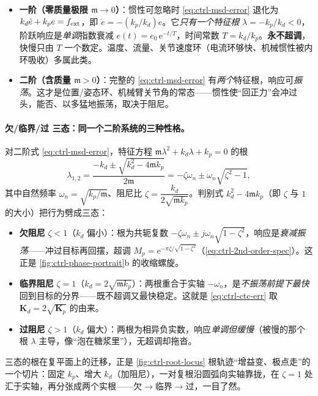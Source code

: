 \begin{itemize}
  \item \textbf{一阶（零质量极限 $\mathfrak m\to0$）}：惯性可忽略时 \cref{eq:ctrl-msd-error} 退化为 $k_d\dot e+k_pe=f_{\rm ext}$，即 $\dot e=-(k_p/k_d)e$。它\emph{只有一个特征根} $\lambda=-k_p/k_d<0$，阶跃响应是\emph{单调}指数衰减 $e(t)=e_0\,\mathrm e^{-t/T}$，时间常数 $T=k_d/k_p$。\textbf{永不超调}，快慢只由 $T$ 一个数定。温度、流量、关节速度环（电流环够快、机械惯性被内环吸收）多属此类。
  \item \textbf{二阶（含质量 $\mathfrak m>0$）}：完整的 \cref{eq:ctrl-msd-error} 有\emph{两个}特征根，响应可\emph{振荡}。这才是位置/姿态环、机械臂关节角的常态——惯性使“回正力”会冲过头，能否、以多猛地振荡，取决于阻尼。
\end{itemize}

\paragraph{欠/临界/过 三态：同一个二阶系统的三种性格。}
对二阶式 \cref{eq:ctrl-msd-error}，特征方程 $\mathfrak m\lambda^2+k_d\lambda+k_p=0$ 的根
\begin{equation}
  \lambda_{1,2}=\frac{-k_d\pm\sqrt{k_d^2-4\mathfrak m k_p}}{2\mathfrak m}
  =-\zeta\omega_n\pm\omega_n\sqrt{\zeta^2-1},
  \label{eq:ctrl-msd-roots}
\end{equation}
其中自然频率 $\omega_n=\sqrt{k_p/\mathfrak m}$、阻尼比 $\zeta=\dfrac{k_d}{2\sqrt{\mathfrak m k_p}}$。判别式 $k_d^2-4\mathfrak m k_p$（即 $\zeta$ 与 $1$ 的大小）把行为劈成三态\cite{lynch2017modern}：
\begin{itemize}
  \item \textbf{欠阻尼} $\zeta<1$（$k_d$ 偏小）：根为共轭复数 $-\zeta\omega_n\pm j\omega_n\sqrt{1-\zeta^2}$，响应是\emph{衰减振荡}——冲过目标再回摆，超调 $M_p=\mathrm e^{-\pi\zeta/\sqrt{1-\zeta^2}}$（\cref{eq:ctrl-2nd-order-spec}）。这正是 \cref{fig:ctrl-phase-portrait}b 的收缩螺旋。
  \item \textbf{临界阻尼} $\zeta=1$（$k_d=2\sqrt{\mathfrak m k_p}$）：两根重合于实轴 $-\omega_n$，是\emph{不振荡前提下最快}回到目标的分界——既不超调又最快稳定。这就是 \cref{eq:ctrl-ctc-err} 取 $\mathbf K_d=2\sqrt{\mathbf K_p}$ 的由来。
  \item \textbf{过阻尼} $\zeta>1$（$k_d$ 偏大）：两根为相异负实数，响应\emph{单调但缓慢}（被慢的那个根 $\lambda$ 主导，像“泡在糖浆里”），无超调却拖沓。
\end{itemize}
三态的根在复平面上的迁移，正是 \cref{fig:ctrl-root-locus} 根轨迹“增益变、极点走”的一个切片：固定 $k_p$、增大 $k_d$（加阻尼），一对复根沿圆弧向实轴靠拢，在 $\zeta=1$ 处汇于实轴，再分张成两个实根——欠$\to$临界$\to$过，一目了然。

